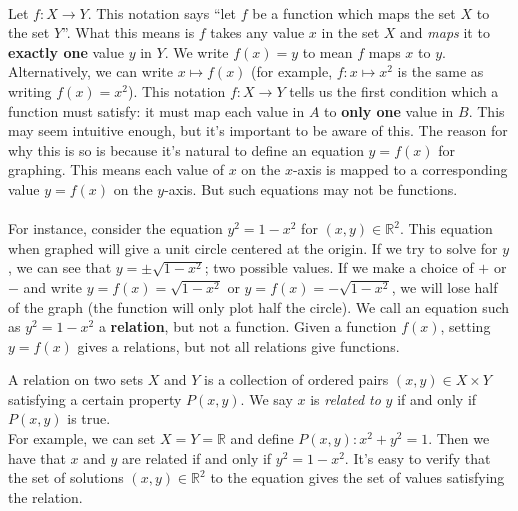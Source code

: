 \documentclass[12pt, a4paper, titlepage, twoside]{article}
\newcommand*{\R}{\mathbb{R}}
\begin{document}
	\paragraph{}
	Let $f : X \to Y$. This notation says ``let $f$ be a function which maps the set $X$ to the set $Y$''. What this means is $f$ takes any value
	$x$ in the set $X$ and \textit{maps} it to \textbf{exactly one} value $y$ in $Y$. We write $f(x) = y$ to mean $f$ maps $x$ to $y$. 
	Alternatively, we can write $x \mapsto f(x)$ (for example, $f : x \mapsto x^2$ is the same as writing $f(x) = x^2$).
	This notation $f : X \to Y$ tells us the first condition which a function must satisfy: it must
	map each value in $A$ to \textbf{only one} value in $B$. This may seem intuitive enough, but it's important to be aware of this. The reason
	for why this is so is because it's natural to define an equation $y = f(x)$ for graphing. This means each value of $x$ on the $x$-axis is mapped
	to a corresponding value $y = f(x)$ on the $y$-axis. But such equations may not be functions. 

	\paragraph{}	
	For instance, consider the equation $y^2 = 1-x^2$ for $(x,y) \in \R^2$. This equation when graphed will give a unit circle centered at the 
	origin. If we try to
	solve for $y$, we can see that $y = \pm \sqrt{1-x^2}$; two possible values. If we make a choice of $+$ or $-$ and write $y = f(x) = 
	\sqrt{1-x^2}$ or $y = f(x) = -\sqrt{1-x^2}$, we will lose half of the graph (the function will only plot half the circle). We call an equation
	such as $y^2 = 1-x^2$ a \textbf{relation}, but not a function. Given a function $f(x)$, setting $y=f(x)$ gives a relations, but not all relations
	give functions.\\
	
	\begin{kp}[Relations]
		A relation on two sets $X$ and $Y$ is a collection of ordered pairs $(x,y) \in X \times Y$ satisfying a certain property $P(x,y)$.
		We say $x$ is \textit{related to} $y$ if and only if $P(x,y)$ is true.\\
		
		For example, we can set $X = Y = \R$ and define $P(x,y): x^2+y^2=1$. Then we have that $x$ and $y$ are related if and only if
		$y^2 = 1-x^2$. It's easy to verify that the set of solutions $(x,y) \in \R^2$ to the equation gives the set of values satisfying the relation.
	\end{kp}
	
\end{document}
